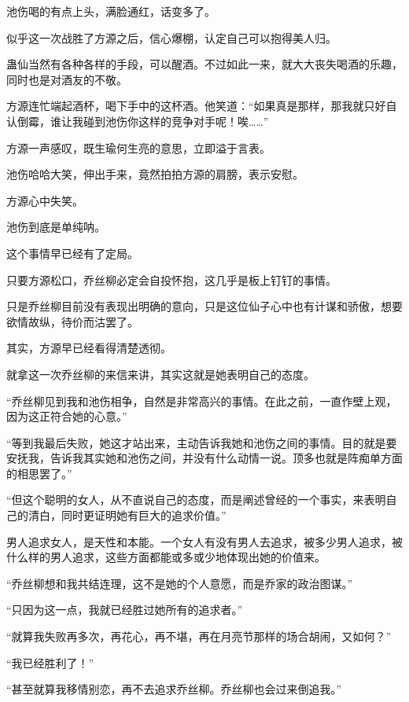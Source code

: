 
\begin{this_body}

池伤喝的有点上头，满脸通红，话变多了。

似乎这一次战胜了方源之后，信心爆棚，认定自己可以抱得美人归。

蛊仙当然有各种各样的手段，可以醒酒。不过如此一来，就大大丧失喝酒的乐趣，同时也是对酒友的不敬。

方源连忙端起酒杯，喝下手中的这杯酒。他笑道：“如果真是那样，那我就只好自认倒霉，谁让我碰到池伤你这样的竞争对手呢！唉……”

方源一声感叹，既生瑜何生亮的意思，立即溢于言表。

池伤哈哈大笑，伸出手来，竟然拍拍方源的肩膀，表示安慰。

方源心中失笑。

池伤到底是单纯呐。

这个事情早已经有了定局。

只要方源松口，乔丝柳必定会自投怀抱，这几乎是板上钉钉的事情。

只是乔丝柳目前没有表现出明确的意向，只是这位仙子心中也有计谋和骄傲，想要欲情故纵，待价而沽罢了。

其实，方源早已经看得清楚透彻。

就拿这一次乔丝柳的来信来讲，其实这就是她表明自己的态度。

“乔丝柳见到我和池伤相争，自然是非常高兴的事情。在此之前，一直作壁上观，因为这正符合她的心意。”

“等到我最后失败，她这才站出来，主动告诉我她和池伤之间的事情。目的就是要安抚我，告诉我其实她和池伤之间，并没有什么动情一说。顶多也就是阵痴单方面的相思罢了。”

“但这个聪明的女人，从不直说自己的态度，而是阐述曾经的一个事实，来表明自己的清白，同时更证明她有巨大的追求价值。”

男人追求女人，是天性和本能。一个女人有没有男人去追求，被多少男人追求，被什么样的男人追求，这些方面都能或多或少地体现出她的价值来。

“乔丝柳想和我共结连理，这不是她的个人意愿，而是乔家的政治图谋。”

“只因为这一点，我就已经胜过她所有的追求者。”

“就算我失败再多次，再花心，再不堪，再在月亮节那样的场合胡闹，又如何？”

“我已经胜利了！”

“甚至就算我移情别恋，再不去追求乔丝柳。乔丝柳也会过来倒追我。”


\end{this_body}
